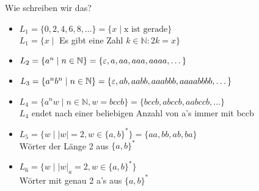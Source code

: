\begin{frame}[fragile]{Wie schreiben wir das?}
    \begin{itemize}[<+- | alert@+>]
        \item $L_1 = \{0,2,4,6,8,\dots\} = \{x \mid \text{x ist gerade}\}$\\
        $L_1 = \{x \mid$ Es gibt eine Zahl $k \in \mathbb{N} : 2k = x\}$\\
        
        \item $L_2 = \{a^n \mid n \in \mathbb{N}\} = \{\varepsilon, a,aa,aaa,aaaa, \dots\}$
        
        \item $L_3 = \{a^nb^n \mid n \in \mathbb{N}\} = \{\varepsilon, ab ,aabb,aaabbb,aaaabbbb, \dots\}$
        
        \item $L_4 = \{a^nw \mid n \in \mathbb{N}, w = bccb\} = \{bccb, abccb, aabccb, \dots\}$\\
        $L_4$ endet nach einer beliebigen Anzahl von a's immer mit bccb
        
        \item $L_5 = \{w \mid |w| = 2, w\in \{a,b\}^{*}\} = \{aa,bb,ab,ba\}$\\
        Wörter der Länge 2 aus $\{a,b\}^{*}$
        
        \item $L_6 = \{w \mid |w|_a = 2, w\in \{a,b\}^{*}\}$\\
        Wörter mit \alert{genau} 2 a's aus $\{a,b\}^{*}$
    \end{itemize}
\end{frame}

